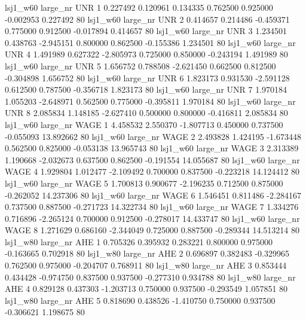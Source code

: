     lsj1_w60   large_nr      UNR                 1  0.227492  0.120961   0.134335 0.762500 0.925000 -0.002953    0.227492 80
    lsj1_w60   large_nr      UNR                 2  0.414657  0.214486  -0.459371 0.775000 0.912500 -0.017894    0.414657 80
    lsj1_w60   large_nr      UNR                 3  1.234501  0.438763  -2.945151 0.800000 0.862500 -0.155386    1.234501 80
    lsj1_w60   large_nr      UNR                 4  1.491989  0.627322  -2.805973 0.725000 0.850000 -0.243194    1.491989 80
    lsj1_w60   large_nr      UNR                 5  1.656752  0.788508  -2.621450 0.662500 0.812500 -0.304898    1.656752 80
    lsj1_w60   large_nr      UNR                 6  1.823173  0.931530  -2.591128 0.612500 0.787500 -0.356718    1.823173 80
    lsj1_w60   large_nr      UNR                 7  1.970184  1.055203  -2.648971 0.562500 0.775000 -0.395811    1.970184 80
    lsj1_w60   large_nr      UNR                 8  2.085834  1.148185  -2.627410 0.500000 0.800000 -0.416811    2.085834 80
    lsj1_w60   large_nr     WAGE                 1  4.458532  2.550370  -1.807713 0.450000 0.737500 -0.055093   13.892662 80
    lsj1_w60   large_nr     WAGE                 2  2.493828  1.424195  -1.673448 0.562500 0.825000 -0.053138   13.965743 80
    lsj1_w60   large_nr     WAGE                 3  2.313389  1.190668  -2.032673 0.637500 0.862500 -0.191554   14.055687 80
    lsj1_w60   large_nr     WAGE                 4  1.929804  1.012477  -2.109492 0.700000 0.837500 -0.223218   14.124412 80
    lsj1_w60   large_nr     WAGE                 5  1.700813  0.900677  -2.196235 0.712500 0.875000 -0.262052   14.237306 80
    lsj1_w60   large_nr     WAGE                 6  1.546451  0.811486  -2.284167 0.737500 0.887500 -0.271723   14.322734 80
    lsj1_w60   large_nr     WAGE                 7  1.334276  0.716896  -2.265124 0.700000 0.912500 -0.278017   14.433747 80
    lsj1_w60   large_nr     WAGE                 8  1.271629  0.686160  -2.344049 0.725000 0.887500 -0.289344   14.513214 80
    lsj1_w80   large_nr      AHE                 1  0.705326  0.395932   0.283221 0.800000 0.975000 -0.163665    0.702918 80
    lsj1_w80   large_nr      AHE                 2  0.696897  0.382483  -0.329965 0.762500 0.975000 -0.204707    0.768911 80
    lsj1_w80   large_nr      AHE                 3  0.853444  0.434428  -0.974750 0.837500 0.937500 -0.277310    0.934788 80
    lsj1_w80   large_nr      AHE                 4  0.829128  0.437303  -1.203713 0.750000 0.937500 -0.293549    1.057851 80
    lsj1_w80   large_nr      AHE                 5  0.818690  0.438526  -1.410750 0.750000 0.937500 -0.306621    1.198675 80
